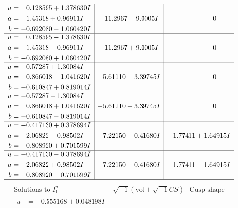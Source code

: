 \documentclass[1p]{elsarticle_modified}
\theoremstyle{definition}
\newcommand{\I}{\sqrt{-1}}
\begin{document}
$$\begin{array}{c|c|c}
\begin{aligned}
u &= \phantom{-}0.128595 + 1.378630 I \\
a &= \phantom{-}1.45318 + 0.96911 I \\
b &= -0.692080 - 1.060420 I\end{aligned}
 & -11.2967 - 9.0005 I & \phantom{-0.000000 } 0 \\ \hline\begin{aligned}
u &= \phantom{-}0.128595 - 1.378630 I \\
a &= \phantom{-}1.45318 - 0.96911 I \\
b &= -0.692080 + 1.060420 I\end{aligned}
 & -11.2967 + 9.0005 I & \phantom{-0.000000 } 0 \\ \hline\begin{aligned}
u &= -0.57287 + 1.30084 I \\
a &= \phantom{-}0.866018 - 1.041620 I \\
b &= -0.610847 + 0.819014 I\end{aligned}
 & -5.61110 - 3.39745 I & \phantom{-0.000000 } 0 \\ \hline\begin{aligned}
u &= -0.57287 - 1.30084 I \\
a &= \phantom{-}0.866018 + 1.041620 I \\
b &= -0.610847 - 0.819014 I\end{aligned}
 & -5.61110 + 3.39745 I & \phantom{-0.000000 } 0 \\ \hline\begin{aligned}
u &= -0.417130 + 0.378694 I \\
a &= -2.06822 - 0.98502 I \\
b &= \phantom{-}0.808920 + 0.701599 I\end{aligned}
 & -7.22150 - 0.41680 I & -1.77411 + 1.64915 I \\ \hline\begin{aligned}
u &= -0.417130 - 0.378694 I \\
a &= -2.06822 + 0.98502 I \\
b &= \phantom{-}0.808920 - 0.701599 I\end{aligned}
 & -7.22150 + 0.41680 I & -1.77411 - 1.64915 I\\
 \hline 
 \end{array}$$\newpage$$\begin{array}{c|c|c}  
\text{Solutions to }I^u_{1}& \I (\text{vol} + \sqrt{-1}CS) & \text{Cusp shape}\\
 \hline 
\begin{aligned}
u &= -0.555168 + 0.048198 I \\

\end{aligned}
\end{array}$$
\end{document}
